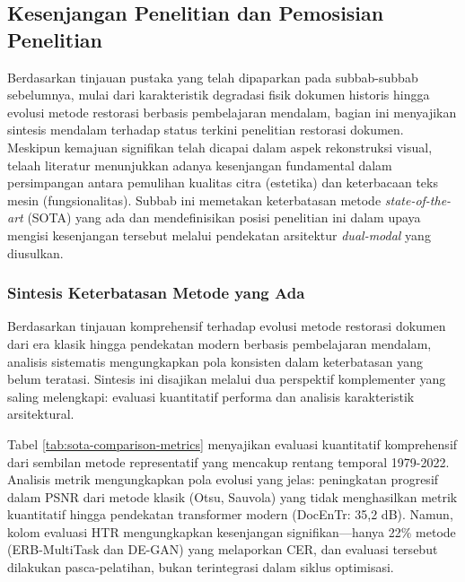 \documentclass[12pt,a4paper]{article}
\begin{document}
\subsection{Kesenjangan Penelitian dan Pemosisian Penelitian}
\label{subsec:research-gap}

Berdasarkan tinjauan pustaka yang telah dipaparkan pada subbab-subbab sebelumnya, mulai dari karakteristik degradasi fisik dokumen historis hingga evolusi metode restorasi berbasis pembelajaran mendalam, bagian ini menyajikan sintesis mendalam terhadap status terkini penelitian restorasi dokumen. Meskipun kemajuan signifikan telah dicapai dalam aspek rekonstruksi visual, telaah literatur menunjukkan adanya kesenjangan fundamental dalam persimpangan antara pemulihan kualitas citra (estetika) dan keterbacaan teks mesin (fungsionalitas). Subbab ini memetakan keterbatasan metode \textit{state-of-the-art} (SOTA) yang ada dan mendefinisikan posisi penelitian ini dalam upaya mengisi kesenjangan tersebut melalui pendekatan arsitektur \textit{dual-modal} yang diusulkan.
\subsubsection{Sintesis Keterbatasan Metode yang Ada}
\label{subsubsec:gap-synthesis}

Berdasarkan tinjauan komprehensif terhadap evolusi metode restorasi dokumen dari era klasik hingga pendekatan modern berbasis pembelajaran mendalam, analisis sistematis mengungkapkan pola konsisten dalam keterbatasan yang belum teratasi. Sintesis ini disajikan melalui dua perspektif komplementer yang saling melengkapi: evaluasi kuantitatif performa dan analisis karakteristik arsitektural.

Tabel \ref{tab:sota-comparison-metrics} menyajikan evaluasi kuantitatif komprehensif dari sembilan metode representatif yang mencakup rentang temporal 1979-2022. Analisis metrik mengungkapkan pola evolusi yang jelas: peningkatan progresif dalam PSNR dari metode klasik (Otsu, Sauvola) yang tidak menghasilkan metrik kuantitatif hingga pendekatan transformer modern (DocEnTr: 35,2 dB). Namun, kolom evaluasi HTR mengungkapkan kesenjangan signifikan---hanya 22\% metode (ERB-MultiTask dan DE-GAN) yang melaporkan CER, dan evaluasi tersebut dilakukan pasca-pelatihan, bukan terintegrasi dalam siklus optimisasi.
\end{document}
